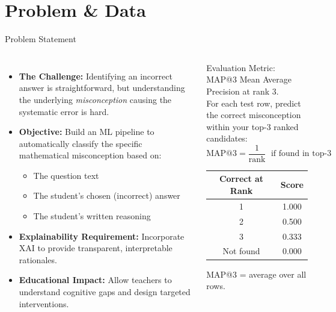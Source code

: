 \documentclass[aspectratio=169]{beamer}
\begin{document}
\section{Problem \& Data}

\begin{frame}{Problem Statement}
\begin{columns}[T]
\begin{itemize}
  \item \textbf{The Challenge:} Identifying an incorrect answer is straightforward, but understanding the underlying \textit{misconception} causing the systematic error is hard.
  \item \textbf{Objective:} Build an ML pipeline to automatically classify the specific mathematical misconception based on:
  \begin{itemize}
    \item The question text
    \item The student's chosen (incorrect) answer
    \item The student's written reasoning
  \end{itemize}
  \item \textbf{Explainability Requirement:} Incorporate XAI to provide transparent, interpretable rationales.
  \item \textbf{Educational Impact:} Allow teachers to understand cognitive gaps and design targeted interventions.
\end{itemize}
\begin{block}{Evaluation Metric: MAP@3}
Mean Average Precision at rank 3.\\[4pt]
For each test row, predict the correct misconception within your top-3 ranked candidates:
\[
  \text{MAP@3} = \frac{1}{\text{rank}} \;\text{ if found in top-3}
\]
\begin{center}
\begin{tabular}{cc}
\toprule
\textbf{Correct at Rank} & \textbf{Score}\\
\midrule
1 & 1.000\\
2 & 0.500\\
3 & 0.333\\
Not found & 0.000\\
\bottomrule
\end{tabular}
\end{center}
MAP@3 = average over all rows.
\end{block}
\end{columns}
\end{frame}
\end{document}
